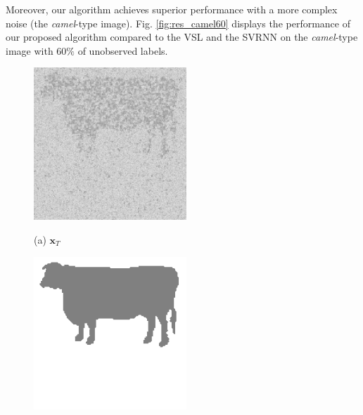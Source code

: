 \documentclass{article}
\def\x{{\mathbf x}}
\begin{document}
Moreover, our algorithm achieves superior performance with a more complex noise (the \textit{camel}-type image).
Fig. \ref{fig:res_camel60} displays the performance of our proposed algorithm compared to the VSL and the SVRNN on the \textit{camel}-type image with $60\%$ of unobserved labels.
\begin{figure}[htb]
    \begin{minipage}[b]{0.30\linewidth}
      \centering
      \centerline{\includegraphics[width=\textwidth, cfbox=black 1pt 0pt]{ress/cow40/cow40.png}}
      \centerline{(a) $\x_T$}\medskip
    \end{minipage}
    \hfill
    \begin{minipage}[b]{.30\linewidth}
      \centering
      \centerline{\includegraphics[width=\textwidth, cfbox=black 1pt 0pt]{ress/cow40/cow40_label.png}}

\end{minipage}
\end{figure}
\end{document}
